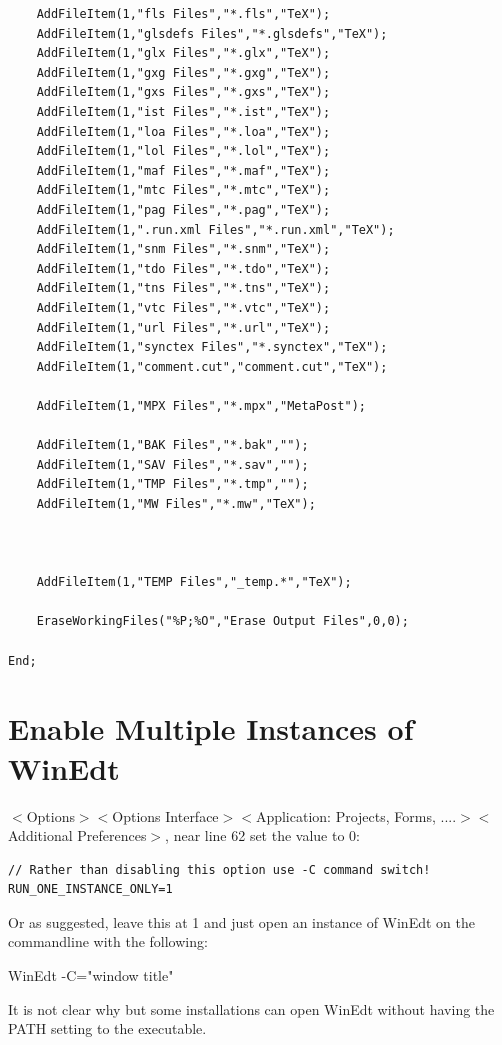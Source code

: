 \begin{lstlisting}
    AddFileItem(1,"fls Files","*.fls","TeX");
    AddFileItem(1,"glsdefs Files","*.glsdefs","TeX");
    AddFileItem(1,"glx Files","*.glx","TeX");
    AddFileItem(1,"gxg Files","*.gxg","TeX");
    AddFileItem(1,"gxs Files","*.gxs","TeX");
    AddFileItem(1,"ist Files","*.ist","TeX");
    AddFileItem(1,"loa Files","*.loa","TeX");
    AddFileItem(1,"lol Files","*.lol","TeX");
    AddFileItem(1,"maf Files","*.maf","TeX");
    AddFileItem(1,"mtc Files","*.mtc","TeX");
    AddFileItem(1,"pag Files","*.pag","TeX");
    AddFileItem(1,".run.xml Files","*.run.xml","TeX");
    AddFileItem(1,"snm Files","*.snm","TeX");
    AddFileItem(1,"tdo Files","*.tdo","TeX");
    AddFileItem(1,"tns Files","*.tns","TeX");
    AddFileItem(1,"vtc Files","*.vtc","TeX");
    AddFileItem(1,"url Files","*.url","TeX");
    AddFileItem(1,"synctex Files","*.synctex","TeX");
    AddFileItem(1,"comment.cut","comment.cut","TeX");

    AddFileItem(1,"MPX Files","*.mpx","MetaPost");

    AddFileItem(1,"BAK Files","*.bak","");
    AddFileItem(1,"SAV Files","*.sav","");
    AddFileItem(1,"TMP Files","*.tmp","");
    AddFileItem(1,"MW Files","*.mw","TeX");



    AddFileItem(1,"TEMP Files","_temp.*","TeX");

    EraseWorkingFiles("%P;%O","Erase Output Files",0,0);

End;
\end{lstlisting}

\section{Enable Multiple Instances of WinEdt}

$<$Options$>$$<$Options Interface$>$$<$Application: Projects, Forms, ....$>$$<$Additional Preferences$>$, near line 62 set the value to 0:

\begin{lstlisting}
// Rather than disabling this option use -C command switch!
RUN_ONE_INSTANCE_ONLY=1
\end{lstlisting}

Or as suggested, leave this at 1 and just open an instance of WinEdt on the commandline with the following:

WinEdt -C="window title"

It is not clear why but some installations can open WinEdt without having the PATH setting to the executable.

